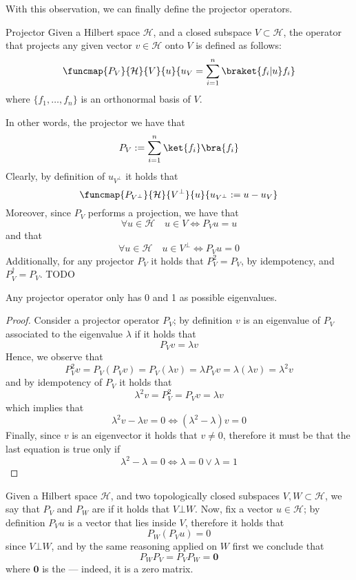 \documentclass[a4paper, 12pt]{report}
\begin{document}
With this observation, we can finally define the projector operators.

\begin{frameddefn}{Projector}
    Given a Hilbert space $\mathcal H$, and a closed subspace $V \subset \mathcal H$, the  operator that projects any given vector $v \in \mathcal H$ onto $V$ is defined as follows: $$\funcmap{P_V}{\mathcal H}{V}{u}{u_V = \sum_{i = 1}^n{\braket{f_i|u} f_i}}$$ where $\{f_1, \ldots, f_n\}$ is an orthonormal basis of $V$.
\end{frameddefn}

In other words, the projector we have that $$P_V := \sum_{i = 1}^n{\ket{f_i} \bra{f_i}}$$ Clearly, by definition of $u_{V^\bot}$ it holds that $$\funcmap{P_{V^\bot}}{\mathcal H}{V^\bot}{u}{u_{V^\bot} := u - u_V}$$ Moreover, since $P_V$ performs a projection, we have that $$\forall u \in \mathcal H \quad u \in V \iff P_Vu = u$$ and that $$\forall u \in \mathcal H \quad u \in V^\bot \iff P_V u = 0$$ Additionally, for any projector $P_V$ it holds that $P_V^2 = P_V$, by idempotency, and $P_V^\dag = P_V$. TODO 

\begin{framedprop}{}
    Any projector operator only has 0 and 1 as possible eigenvalues.
\end{framedprop}

\begin{proof}
    Consider a projector operator $P_V$; by definition $v$ is an eigenvalue of $P_V$ associated to the eigenvalue $\lambda$ if it holds that $$P_Vv = \lambda v$$ Hence, we observe that $$P_V^2 v = P_V (P_V v) = P_V(\lambda v) = \lambda P_Vv = \lambda(\lambda v) = \lambda^2 v$$ and by idempotency of $P_V$ it holds that $$\lambda^2 v = P_V^2 = P_Vv = \lambda v$$ which implies that $$\lambda^2v - \lambda v = 0 \iff (\lambda^2 - \lambda)v = 0$$ Finally, since $v$ is an eigenvector it holds that $v \neq 0$, therefore it must be that the last equation is true only if $$\lambda^2 - \lambda = 0 \iff \lambda = 0 \lor \lambda = 1$$
\end{proof}

Given a Hilbert space $\mathcal H$, and two topologically closed subspaces $V, W \subset \mathcal H$, we say that $P_V$ and $P_W$ are  if it holds that $V \bot W$. Now, fix a vector $u \in \mathcal H$; by definition $P_Vu$ is a vector that lies inside $V$, therefore it holds that $$P_W(P_Vu) = 0$$ since $V \bot W$, and by the same reasoning applied on $W$ first we conclude that $$P_WP_V = P_VP_W = \mathbf 0$$ where $\mathbf 0$ is the  --- indeed, it is a zero matrix.
\end{document}
